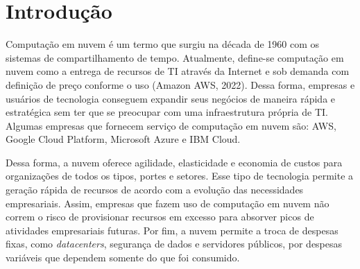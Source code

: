 \chapter{Introdução}\label{chapter:introducao}

Computação em nuvem é um termo que surgiu na década de 1960 com os sistemas de compartilhamento de tempo. Atualmente, define-se computação em nuvem como a entrega de recursos de TI através da Internet e sob demanda com definição de preço conforme o uso (Amazon AWS, 2022). Dessa forma, empresas e usuários de tecnologia conseguem expandir seus negócios de maneira rápida e estratégica sem ter que se preocupar com uma infraestrutura própria de TI. Algumas empresas que fornecem serviço de computação em nuvem são: AWS, Google Cloud Platform, Microsoft Azure e IBM Cloud.

Dessa forma, a nuvem oferece agilidade, elasticidade e economia de custos para organizações de todos os tipos, portes e setores. Esse tipo de tecnologia permite a geração rápida de recursos de acordo com a evolução das necessidades empresariais. Assim, empresas que fazem uso de computação em nuvem não correm o risco de provisionar recursos em excesso para absorver picos de atividades empresariais futuras. Por fim, a nuvem permite a troca de despesas fixas, como \textit{datacenters}, segurança de dados e servidores públicos, por despesas variáveis que dependem somente do que foi consumido.




